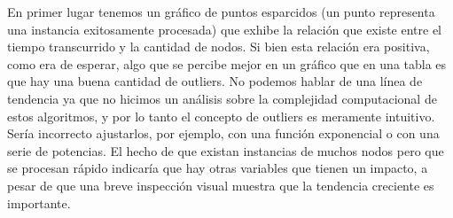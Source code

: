 En primer lugar tenemos un gráfico de puntos esparcidos (un punto representa una instancia exitosamente procesada) que exhibe la relación que existe entre el tiempo transcurrido y la cantidad de nodos. Si bien esta relación era positiva, como era de esperar, algo que se percibe mejor en un gráfico que en una tabla es que hay una buena cantidad de outliers. No podemos hablar de una línea de tendencia ya que no hicimos un análisis sobre la complejidad computacional de estos algoritmos, y por lo tanto el concepto de outliers es meramente intuitivo. Sería incorrecto ajustarlos, por ejemplo, con una función exponencial o con una serie de potencias. El hecho de que existan instancias de muchos nodos pero que se procesan rápido indicaría que hay otras variables que tienen un impacto, a pesar de que una breve inspección visual muestra que la tendencia creciente es importante.    

